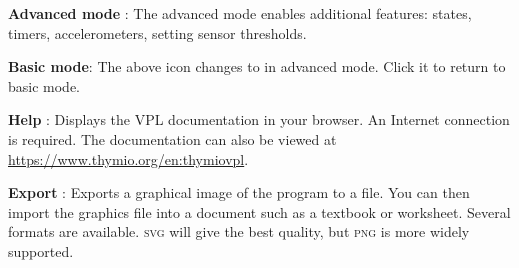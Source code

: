 \textbf{Advanced mode} : The advanced mode enables
additional features: states, timers, accelerometers, setting sensor
thresholds.

\textbf{Basic mode}: The above icon changes to  in advanced mode.
Click it to return to basic mode.

\newpage

\textbf{Help} : Displays the VPL documentation in your
browser. An Internet connection is required. The documentation can also
be viewed at \href{https://www.thymio.org/en:thymiovpl}{https://www.thymio.org/en:thymiovpl}.

\bigskip

\textbf{Export} : \label{p.export} Exports a graphical
image of the program to a file. You can then import the graphics file
into a document such as a textbook or worksheet. Several formats are
available. \textsc{svg} will give the best quality, but \textsc{png} is
more widely supported.




